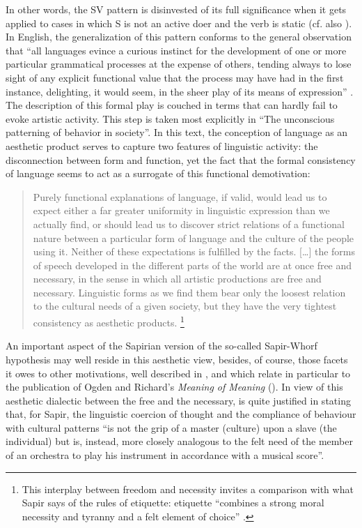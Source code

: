 \documentclass[output=paper]{langscibook}
\begin{document}
In other words, the SV pattern is disinvested of its full significance when it gets applied to cases in which S is not an active doer and the verb is static (cf. also \citealt[14--15]{Sapir1921}). In English, the generalization of this pattern conforms to the general observation that ``all languages evince a curious instinct for the development of one or more particular grammatical processes at the expense of others, tending always to lose sight of any explicit functional value that the process may have had in the first instance, delighting, it would seem, in the sheer play of its means of expression'' \citep[60]{Sapir1921}. The description of this formal play is couched in terms that can hardly fail to evoke artistic activity. This step is taken most explicitly in ``The unconscious patterning of behavior in society''. In this text, the conception of language as an aesthetic product serves to capture two features of linguistic activity: the disconnection between form and function, yet the fact that the formal consistency of language seems to act as a surrogate of this functional demotivation:

\begin{quotation}
Purely functional explanations of language, if valid, would lead us to expect either a far greater uniformity in linguistic expression than we actually find, or should lead us to discover strict relations of a functional nature between a particular form of language and the culture of the people using it. Neither of these expectations is fulfilled by the facts. […] the forms of speech developed in the different parts of the world are at once free and necessary, in the sense in which all artistic productions are free and necessary. Linguistic forms as we find them bear only the loosest relation to the cultural needs of a given society, but they have the very tightest consistency as aesthetic products. \citep[550]{Sapir1927b}\footnote{This interplay between freedom and necessity invites a comparison with what Sapir says of the rules of etiquette: etiquette ``combines a strong moral necessity and tyranny and a felt element of choice'' \citep[236]{Sapir2002}.} 
\end{quotation}

An important aspect of the Sapirian version of the so-called Sapir-Whorf hypothesis may well reside in this aesthetic view, besides, of course, those facets it owes to other motivations, well described in \citet{Joseph2002}, and which relate in particular to the publication of Ogden and Richard's \emph{Meaning of Meaning} (\citeyear{Ogden1923}). In view of this aesthetic dialectic between the free and the necessary, \citet[462]{Allen1986} is quite justified in stating that, for Sapir, the linguistic coercion of thought and the compliance of behaviour with cultural patterns ``is not the grip of a master (culture) upon a slave (the individual) but is, instead, more closely analogous to the felt need of the member of an orchestra to play his instrument in accordance with a musical score''.
\end{document}
